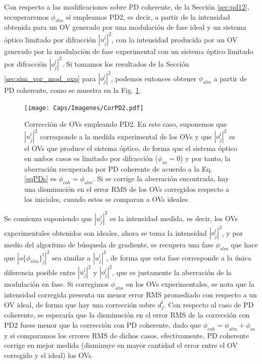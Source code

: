 
Con respecto a las modificaciones sobre PD coherente, de la Sección \ref{sec:pd12}, recuperaremos $\phi_{slm}$ si empleamos PD2, es decir, a partir de la intensidad obtenida para un OV generado por una modulación de fase ideal y un sistema óptico limitado por difracción $|u_j^l|^2$, con la intensidad producida por un OV generado por la modulación de fase experimental con un sistema óptico limitado por difracción $|o_j^l|^2$. Si tomamos los resultados de la Sección \ref{sec:sim_vor_mod_exp} para $|o_j^l|^2$, podemos entonces obtener $\phi_{slm}$ a partir de PD coherente, como se muestra en la Fig. \ref{fig:corpd2}. \\

\begin{figure}[!ht]
  \centering
    \texttt{[image: Caps/Imagenes/CorPD2.pdf]}
  \caption[Corrección de OVs empleando PD2.]{Corrección de OVs empleando PD2. En este caso, suponemos que $|u_j^l|^2$ corresponde a la medida experimental de los OVs y que $|o_j^l|^2$ es el OVs que produce el sistema óptico, de forma que el sistema óptico en ambos casos es limitado por difracción ($\phi_{so}=0$) y por tanto, la aberración recuperada por PD coherente de acuerdo a la Eq. \ref{eqPDs} es $\phi_{coh} = \phi_{slm}$. Si se corrige la aberración encontrada, hay una disminución en el error RMS de los OVs corregidos respecto a los iniciales, cuando estos se comparan a OVs ideales.}
  \label{fig:corpd2}
\end{figure}


Se comienza suponiendo que $|u_j^l|^2$ es la intensidad medida, es decir, los OVs experimentales obtenidos son ideales, ahora se toma la intensidad $|o_j^l|^2$, y por medio del algoritmo de búsqueda de gradiente, se recupera una fase $\phi_{slm}$ que hace que $|o\{\phi_{slm}\}_j^l|^2$ sea similar a $|u_j^l|^2$, de forma que esta fase corresponde a la única diferencia posible entre $|u_j^l|^2$ y $|o_j^l|^2$, que es justamente la aberración de la modulación en fase. Si corregimos $\phi_{slm}$ en los OVs experimentales, se nota que la intensidad corregida presenta un menor error RMS promediado con respecto a un OV ideal, de forma que hay una corrección sobre $d_j^l$. Con respecto al caso de PD coherente, se esperaría que la disminución en el error RMS de la corrección con PD2 fuese menor que la corrección con PD coherente, dado que $\phi_{coh} = \phi_{slm}+\phi_{os}$ y si comparamos los errores RMS de dichos casos, efectivamente, PD coherente corrige en mejor medida (disminuye en mayor cantidad el error entre el OV corregido y el ideal) los OVs.\\

